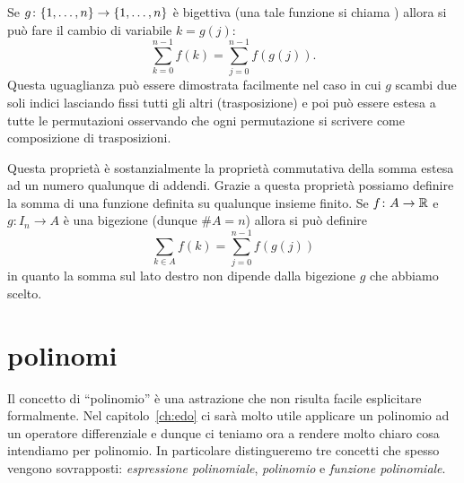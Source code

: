 Se $g\colon {\left\{ 1,\dots, n \right\}} \to {\left\{ 1,\dots, n \right\}}$
è bigettiva (una tale funzione si chiama )
allora si può fare il cambio di variabile $k=g(j)$:
\[
    \sum_{k=0}^{n-1} f(k) = \sum_{j=0}^{n-1} f(g(j)).
\]
Questa uguaglianza può essere dimostrata facilmente nel caso 
in cui $g$ scambi due soli indici lasciando fissi tutti gli altri 
(trasposizione) e poi può essere estesa a tutte le permutazioni
osservando che ogni permutazione si scrivere come composizione 
di trasposizioni.

Questa proprietà è sostanzialmente la proprietà commutativa della somma 
estesa ad un numero qualunque di addendi.
Grazie a questa proprietà possiamo definire la somma di una funzione 
definita su qualunque insieme finito. 
Se $f\colon A \to \mathbb R$ e $g\colon I_n \to A$ è una bigezione (dunque $\#A = n$)
allora si può definire 
\[
  \sum_{k\in A} f(k) = \sum_{j=0}^{n-1} f(g(j))  
\]
in quanto la somma sul lato destro non dipende dalla bigezione $g$ che 
abbiamo scelto.

\section{polinomi}

Il concetto di ``polinomio'' è una astrazione che non risulta facile esplicitare formalmente.
Nel capitolo~\ref{ch:edo} ci sarà molto utile applicare un polinomio ad un operatore 
differenziale e dunque ci teniamo ora a rendere molto chiaro cosa intendiamo per polinomio.
In particolare distingueremo tre concetti che spesso vengono sovrapposti: 
\emph{espressione polinomiale}, \emph{polinomio} e \emph{funzione polinomiale}.

